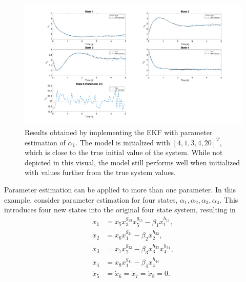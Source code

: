 \begin{figure}[h]
    \centering
    \includegraphics[scale = 0.3]{EKF_1param.png}
    \caption{Results obtained by implementing the EKF with parameter estimation of $\alpha_1$. The model is initialized with $[4, 1, 3, 4, 20]^T$, which is close to the true initial value of the system. While not depicted in this visual, the model still performs well when initialized with values further from the true system values. }
    \label{fig:EKF_1param}
\end{figure}



\clearpage

\noindent Parameter estimation can be applied to more than one parameter. In this example, consider parameter estimation for four states, $\alpha_1, \alpha_2, \alpha_3, \alpha_4$. This introduces four new states into the original four state system, resulting in 
\begin{align*}
\dot x_1 &= x_5  x_3^{g_{13}} x_5^{g_{15}} - \beta_1 x_1^{h_{11}} , \\
\dot x_2 &= x_6  x_1^{g_{21}} - \beta_2 x_2^{h_{22}}, \\
\dot x_3 &= x_7  x_2^{g_{32}} - \beta_3 x_3^{h_{33}} x_4^{h_{34}}, \\
\dot x_4 &= x_8   x_1^{g_{41}} - \beta_4 x_4^{h_{44}} \\
\dot x_5 &= \dot x_6= \dot x_7 = \dot x_8 = 0.
\end{align*}

